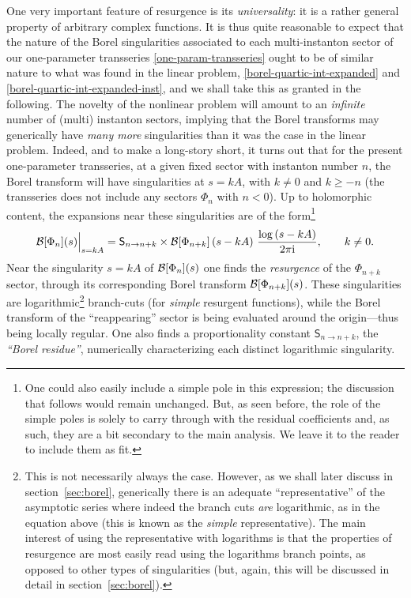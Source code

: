 \documentclass[11pt,a4paper]{article}
\newcommand{\CB}{{\cal B}}
\newcommand{\be}{\begin{equation}}
\newcommand{\ee}{\end{equation}}
\newcommand{\rmi}{{\mathrm{i}}}
\begin{document}
One very important feature of resurgence is its \textit{universality}: it is a rather general property of arbitrary complex functions. It is thus quite reasonable to expect that the nature of the Borel singularities associated to each multi-instanton sector of our one-parameter transseries \eqref{one-param-transseries} ought to be of similar nature to what was found in the linear problem, \eqref{borel-quartic-int-expanded} and \eqref{borel-quartic-int-expanded-inst}, and we shall take this as granted in the following. The novelty of the nonlinear problem will amount to an \textit{infinite} number of (multi) instanton sectors, implying that the Borel transforms may generically have \textit{many more} singularities than it was the case in the linear problem. Indeed, and to make a long-story short, it turns out that for the present one-parameter transseries, at a given fixed sector with instanton number $n$, the Borel transform will have singularities at $s = k A$, with $k \neq 0$ and $k \ge -n$ (the transseries does not include any sectors $\Phi_n$ with $n < 0$). Up to holomorphic content, the expansions near these singularities are of the form\footnote{One could also easily include a simple pole in this expression; the discussion that follows would remain unchanged. But, as seen before, the role of the simple poles is solely to carry through with the residual coefficients and, as such, they are a bit secondary to the main analysis. We leave it to the reader to include them as fit.} \cite{e81}
%
\be
\label{Borel-transf-expanded-one-param}
\CB [\Phi_n] (s) \Big|_{s=kA} = \mathsf{S}_{n\to n+k} \times \CB [\Phi_{n+k}] \left( s-kA\right)\, \frac{\log \left( s-kA \right)}{2\pi\rmi}, \qquad k\neq0.
\ee
%
\noindent
Near the singularity $s=kA$ of $\CB [\Phi_n] (s)$ one finds the \textit{resurgence} of the $\Phi_{n+k}$ sector, through its corresponding Borel transform $\CB [\Phi_{n+k}] (s)$. These singularities are logarithmic\footnote{This is not necessarily always the case. However, as we shall later discuss in section~\ref{sec:borel}, generically there is an adequate ``representative'' of the asymptotic series where indeed the branch cuts \textit{are} logarithmic, as in the equation above (this is known as the \textit{simple} representative). The main interest of using the representative with logarithms is that the properties of resurgence are most easily read using the logarithms branch points, as opposed to other types of singularities (but, again, this will be discussed in detail in section~\ref{sec:borel}).} branch-cuts (for \textit{simple} resurgent functions), while the Borel transform of the ``reappearing'' sector is being evaluated around the origin---thus being locally regular. One also finds a proportionality constant $\mathsf{S}_{n\to n+k}$, the \textit{``Borel residue''}, numerically characterizing each distinct logarithmic singularity.
\end{document}
